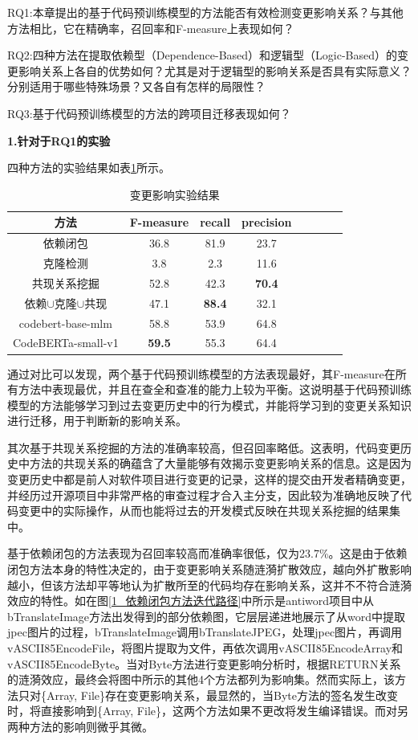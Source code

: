 RQ1:本章提出的基于代码预训练模型的方法能否有效检测变更影响关系？与其他方法相比，它在精确率，召回率和F-measure上表现如何？

RQ2:四种方法在提取依赖型（Dependence-Based）和逻辑型（Logic-Based）的变更影响关系上各自的优势如何？尤其是对于逻辑型的影响关系是否具有实际意义？分别适用于哪些特殊场景？又各自有怎样的局限性？

RQ3:基于代码预训练模型的方法的跨项目迁移表现如何？

\textbf{1.针对于RQ1的实验}

四种方法的实验结果如表\ref{1_变更影响实验结果}所示。


\begin{table}[htbp]
\caption{变更影响实验结果}
\label{1_变更影响实验结果}
\vspace{0.5em}\centering\wuhao
\begin{tabular}{cccccccc}
\toprule
方法 & F-measure & recall & precision  \\
\midrule
依赖闭包 & 36.8&81.9&23.7  \\
克隆检测 & 3.8&2.3&11.6 \\
共现关系挖掘 & 52.8&42.3&\textbf{70.4} \\
依赖$\cup$克隆$\cup$共现 & 47.1&\textbf{88.4}&32.1 \\
codebert-base-mlm & 58.8&53.9&64.8 \\
CodeBERTa-small-v1 & \textbf{59.5} & 55.3 & 64.4 \\
\bottomrule
\end{tabular}
\end{table}

通过对比可以发现，两个基于代码预训练模型的方法表现最好，其F-measure在所有方法中表现最优，并且在查全和查准的能力上较为平衡。这说明基于代码预训练模型的方法能够学习到过去变更历史中的行为模式，并能将学习到的变更关系知识进行迁移，用于判断新的影响关系。

其次基于共现关系挖掘的方法的准确率较高，但召回率略低。这表明，代码变更历史中方法的共现关系的确蕴含了大量能够有效揭示变更影响关系的信息。这是因为变更历史中都是前人对软件项目进行变更的记录，这样的提交由开发者精确变更，并经历过开源项目中非常严格的审查过程才合入主分支，因此较为准确地反映了代码变更中的实际操作，从而也能将过去的开发模式反映在共现关系挖掘的结果集中。


基于依赖闭包的方法表现为召回率较高而准确率很低，仅为23.7\%。这是由于依赖闭包方法本身的特性决定的，由于变更影响关系随涟漪扩散效应，越向外扩散影响越小，但该方法却平等地认为扩散所至的代码均存在影响关系，这并不不符合涟漪效应的特性。如在图\ref{1_依赖闭包方法迭代路径}中所示是antiword项目中从bTranslateImage方法出发得到的部分依赖图，它层层递进地展示了从word中提取jpec图片的过程，bTranslateImage调用bTranslateJPEG，处理jpec图片，再调用vASCII85EncodeFile，将图片提取为文件，再依次调用vASCII85EncodeArray和vASCII85EncodeByte。当对Byte方法进行变更影响分析时，根据RETURN关系的涟漪效应，最终会将图中所示的其他4个方法都列为影响集。然而实际上，该方法只对\{Array, File\}存在变更影响关系，最显然的，当Byte方法的签名发生改变时，将直接影响到\{Array, File\}，这两个方法如果不更改将发生编译错误。而对另两种方法的影响则微乎其微。

